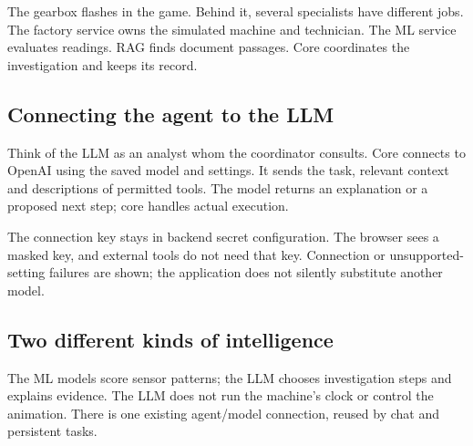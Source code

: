 The gearbox flashes in the game. Behind it, several specialists have different jobs. The factory service owns the simulated machine and technician. The ML service evaluates readings. RAG finds document passages. Core coordinates the investigation and keeps its record.

\subsection*{Connecting the agent to the LLM}
Think of the LLM as an analyst whom the coordinator consults. Core connects to OpenAI using the saved model and settings. It sends the task, relevant context and descriptions of permitted tools. The model returns an explanation or a proposed next step; core handles actual execution.

The connection key stays in backend secret configuration. The browser sees a masked key, and external tools do not need that key. Connection or unsupported-setting failures are shown; the application does not silently substitute another model.

\subsection*{Two different kinds of intelligence}
The ML models score sensor patterns; the LLM chooses investigation steps and explains evidence. The LLM does not run the machine's clock or control the animation. There is one existing agent/model connection, reused by chat and persistent tasks.

